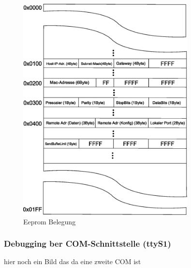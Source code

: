 \documentclass[a4paper]{book}%
\begin{document}
\begin{figure}[H]
	\centering
	\includegraphics[width=0.8\textwidth]{figures/eeprom-belegung.eps}
	\caption[Eeprom Belegung]{Eeprom Belegung}
	\label{fig:eeprom}
\end{figure}





\subsubsection{Debugging ber COM-Schnittstelle (ttyS1)}

hier noch ein Bild das da eine zweite COM ist
\end{document}
